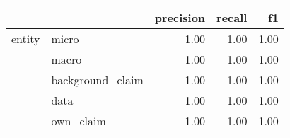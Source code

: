 \begin{tabular}{llrrr}
\toprule
       &           &  precision &  recall &   f1 \\
\midrule
entity & micro &       1.00 &    1.00 & 1.00 \\
       & macro &       1.00 &    1.00 & 1.00 \\
       & background\_claim &       1.00 &    1.00 & 1.00 \\
       & data &       1.00 &    1.00 & 1.00 \\
       & own\_claim &       1.00 &    1.00 & 1.00 \\
\bottomrule
\end{tabular}
